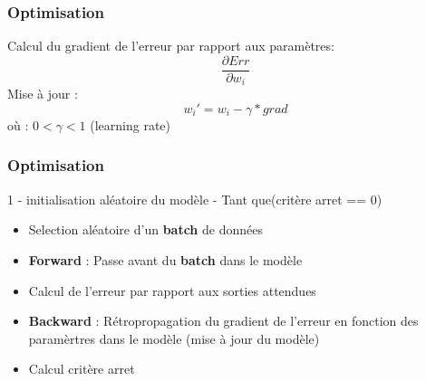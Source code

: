 \begin{frame}
  \frametitle{Optimisation}
  Calcul du gradient de l'erreur par rapport aux paramètres:
  \[
  \frac{\partial{Err}}{\partial{w_i}}
  \]
  Mise à jour :
  \[
  w_i' = w_i - \gamma * grad 
  \]
  où : $0 < \gamma < 1$ (learning rate)
\end{frame}

\begin{frame}
  \frametitle{Optimisation}
  1 - initialisation aléatoire du modèle
   - Tant que(critère arret == 0)
  \begin{itemize}
  \item Selection aléatoire d'un \textbf{batch} de données
  \item \textbf{Forward} : Passe avant du \textbf{batch} dans le modèle
  \item Calcul de l'erreur par rapport aux sorties attendues
  \item \textbf{Backward} : Rétropropagation du gradient de l'erreur en fonction des paramèrtres dans le modèle (mise à jour du modèle)
  \item Calcul critère arret
  \end{itemize}
\end{frame}
